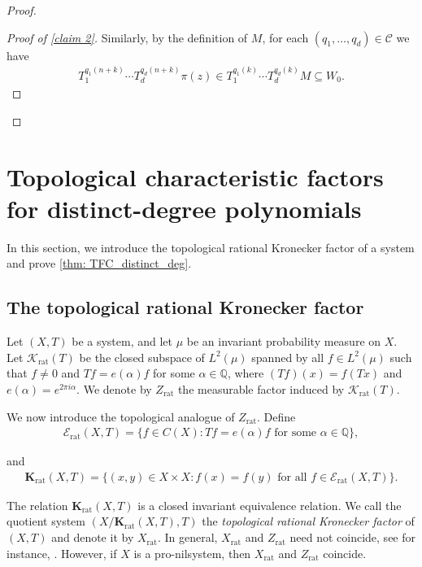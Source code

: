 \documentclass[11pt,reqno]{amsart}
\newcommand{\Q}{\mathbb{Q}}
\newcommand{\Krat}{\mathbf{K}_{\operatorname{rat}}}
\newcommand{\cC}{{\mathcal C}}
\theoremstyle{definition}
\theoremstyle{remark}
\begin{document}
\begin{proof}
\begin{proof}[Proof of \cref{claim 2}]
    Similarly, by the definition of $M$, for each $(q_1,\dots,q_d)\in\cC$ we have\begin{align*}
        T_1^{q_1(n+k)}\cdots T_d^{q_d(n+k)}\pi(z) \in T_1^{q_1(k)}\cdots T_d^{q_d(k)}M \subseteq W_0.
    \end{align*}
\end{proof}

\end{proof}

\section{Topological characteristic factors for distinct-degree polynomials}

In this section, we introduce the topological rational Kronecker factor of a system and prove \cref{thm: TFC_distinct_deg}.

\subsection{The topological rational Kronecker factor}\label{subsec: Krat}

Let $(X,T)$ be a system, and let $\mu$ be an invariant probability measure on $X$. Let $\mathcal{K}_{\operatorname{rat}}(T)$ be the closed subspace of $L^{2}(\mu)$ spanned by all $f\in L^{2}(\mu)$ such that $f\neq 0$ and $Tf = e(\alpha) f$ for some $\alpha\in\Q$, where $(Tf)(x)=f(Tx)$ and $e(\alpha)=e^{2\pi i \alpha}$. We denote by $Z_{\operatorname{rat}}$ the measurable factor induced by $\mathcal{K}_{\operatorname{rat}}(T)$.

We now introduce the topological analogue of  $Z_{\operatorname{rat}}$. Define\begin{align*}
    \mathcal{E}_{\operatorname{rat}}(X,T) = \{f\in C(X): Tf = e(\alpha) f \text{ for some }\alpha\in\Q\},
\end{align*}

and \begin{align*}
    \Krat(X,T) = \{(x,y)\in X\times X: f(x)=f(y)\text{ for all }f\in \mathcal{E}_{\operatorname{rat}}(X,T)\}.
\end{align*}

The relation $\Krat(X,T)$ is a closed invariant equivalence relation. We call the quotient system $(X/\Krat(X,T),T)$ the \emph{topological rational Kronecker factor} of $(X,T)$ and denote it by $X_{\operatorname{rat}}$. In general, $X_{\operatorname{rat}}$ and $Z_{\operatorname{rat}}$ need not coincide, see for instance, \cite[Section 7]{Bressaud_Durand_Maass_Eigenvalues_finite_rank:2010}. However, if $X$ is a pro-nilsystem, then $X_{\operatorname{rat}}$ and $Z_{\operatorname{rat}}$ coincide. 
\end{document}
